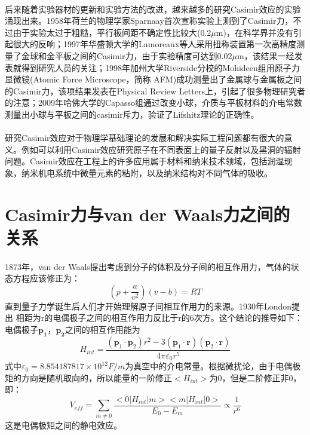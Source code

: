 \paragraph*{}
后来随着实验器材的更新和实验方法的改进，越来越多的研究Casimir效应的实验涌现出来。1958年荷兰的物理学家Sparnaay首次宣称实验上测到了Casimir力\cite{Sparnaay_1958}，不过由于实验太过于粗糙，平行板间距不确定性比较大(0.2$\mu$m)，在科学界并没有引起很大的反响；1997年华盛顿大学的Lamoreaux等人采用扭称装置第一次高精度测量了金球和金平板之间的Casimir力\cite{Lamoreaux_1997}，由于实验精度可达到0.02$\mu$m，该结果一经发表就得到研究人员的关注；1998年加州大学Riverside分校的Mohideen组用原子力显微镜(Atomic Force Microscope，简称 AFM)成功测量出了金属球与金属板之间的Casimir力\cite{Mohideen_1998}，该项结果发表在Physical Review Letters上，引起了很多物理研究者的注意；2009年哈佛大学的Capasso组通过改变小球，介质与平板材料的介电常数测量出小球与平板之间的casimir斥力\cite{Capasso_2009}，验证了Lifshitz理论的正确性。
\paragraph*{}
研究Casimir效应对于物理学基础理论的发展和解决实际工程问题都有很大的意义。例如可以利用Casimir效应研究原子在不同表面上的量子反射\cite{Antezza_2004,Babb_2004}以及黑洞的辐射问题\cite{Lamoreaux_2007}。Casimir效应在工程上的许多应用属于材料\cite{Krech_1994}和纳米技术领域\cite{Buks_2001,Buks_2002,Chumak_2004}，包括润湿现象，纳米机电系统中微量元素的粘附，以及纳米结构对不同气体的吸收。



\section{Casimir力与van der Waals力之间的关系}
\paragraph*{}
1873年，van der Waals提出考虑到分子的体积及分子间的相互作用力\cite{Maxwell_1874}，气体的状态方程应该修正为：
$$
(p+\frac{a}{v^2})(v-b)=RT
$$
直到量子力学诞生后人们才开始理解原子间相互作用力的来源。1930年London\cite{Eisenschitz_1930,London_1930}提出 相距为r的电偶极子之间的相互作用力反比于r的6次方。这个结论的推导如下：电偶极子$\boldsymbol{p_1}$，$\boldsymbol{p_2}$之间的相互作用能为
$$
H_{int}=\frac{\left(\boldsymbol{p}_1\cdot \boldsymbol{p}_2 \right) r^2-3\left(\boldsymbol{p}_1\cdot \boldsymbol{r} \right) \left(\boldsymbol{p}_2\cdot \boldsymbol{r} \right)}{4\pi \varepsilon_0 r^5}
$$
式中$\varepsilon_0=8.854187817×10^{12}F/m$为真空中的介电常量。根据微扰论，由于电偶极矩的方向是随机取向的，所以能量的一阶修正$<H_{int}>$为0，但是二阶修正非0，即：
$$
V_{eff}=\sum_{m\ne 0}{\frac{<0|H_{int}|m><m|H_{int}|0>}{E_0-E_{m}}}\propto \frac{1}{r^6}
$$
这是电偶极矩之间的静电效应。
